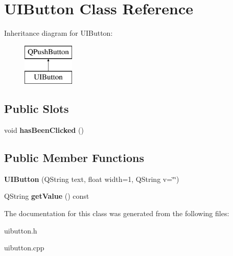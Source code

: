 \hypertarget{class_u_i_button}{}\section{U\+I\+Button Class Reference}
\label{class_u_i_button}
Inheritance diagram for U\+I\+Button\+:\begin{figure}[H]
\begin{center}
\leavevmode
\includegraphics[height=2.000000cm]{class_u_i_button}
\end{center}
\end{figure}
\subsection*{Public Slots}
\begin{DoxyCompactItemize}
\item 
void {\bfseries has\+Been\+Clicked} ()\hypertarget{class_u_i_button_ad26644e8110959776eb35d4344dc9643}{}\label{class_u_i_button_ad26644e8110959776eb35d4344dc9643}

\end{DoxyCompactItemize}
\subsection*{Public Member Functions}
\begin{DoxyCompactItemize}
\item 
{\bfseries U\+I\+Button} (Q\+String text, float width=1, Q\+String v=\char`\"{}\char`\"{})\hypertarget{class_u_i_button_ac9d769d4b51156313eee17f18e4cee49}{}\label{class_u_i_button_ac9d769d4b51156313eee17f18e4cee49}

\item 
Q\+String {\bfseries get\+Value} () const \hypertarget{class_u_i_button_a86f2e2f571013d90f302ea615dd050bf}{}\label{class_u_i_button_a86f2e2f571013d90f302ea615dd050bf}

\end{DoxyCompactItemize}


The documentation for this class was generated from the following files\+:\begin{DoxyCompactItemize}
\item 
uibutton.\+h\item 
uibutton.\+cpp\end{DoxyCompactItemize}
